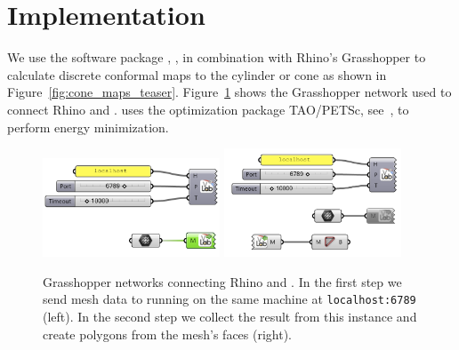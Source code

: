 \documentclass[article.tex]{subfiles}
\begin{document}
\section{Implementation}
\label{sec:implementation}

We use the software package \VaryLab, \cite{varylab-web-page}, in
combination with Rhino's Grasshopper to calculate discrete conformal
maps to the cylinder or cone as shown in Figure~\ref{fig:cone_maps_teaser}.
Figure~\ref{fig:grasshopper} shows the Grasshopper network used to
connect Rhino and \VaryLab.
\VaryLab uses the optimization package {\sc TAO/PETSc}, see~\cite{tao-user-ref, 
petsc-web-page, jpetsctao-web-page}, to perform energy
minimization.


\begin{figure}[tb]
	\includegraphics[width=0.47\textwidth]{images/setup03.png}
	\hspace{0.06\textwidth}
	\includegraphics[width=0.47\textwidth]{images/setup04.png}
	\caption{Grasshopper networks connecting Rhino and
          \VaryLab{}. In the first step we send mesh data to \VaryLab{}
          running on the same machine at {\tt localhost:6789}
          (left). In the second step we collect the result from this
          \VaryLab{} instance and create polygons from the mesh's
          faces (right).}
	\label{fig:grasshopper}
\end{figure}

\subfilebibliography
\end{document}
